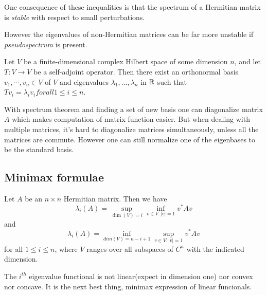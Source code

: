 One consequence of these inequalities is that the spectrum of a Hermitian matrix is \textit{stable} with respect to small perturbations.

However the eigenvalues of non-Hermitian matrices can be far more unstable if \textit{pseudospectrum} is present.

\begin{theorem}
    Let $V$ be a finite-dimensional complex Hilbert space of some dimension $n$, and let $T:V\to V$ be a self-adjoint operator. Then there exist an orthonormal basis $v_1,\cdots ,v_n \in V$ of $V$ and eigenvalues $\lambda_1,\dots,\lambda_n$ in $\mathbb{R}$ such that $Tv_i=\lambda_iv_i for all 1\leq i\leq n$.
\end{theorem}

With spectrum theorem and finding a set of new basis one can diagonalize matrix $A$ which makes computation of matrix function easier. 
But when dealing with multiple matrices, it's hard to diagonalize matrices simultaneously, unless all the matrices are commute. 
However one can still normalize one of the eigenbases to be the standard basis.

\subsection{Minimax formulae}

\begin{theorem}
    \label{Courant-Fisher minimax theorem}
    Let $A$ be an $n\times n$ Hermitian matrix. Then we have 
    \begin{equation}
        \lambda_i(A) = \sup_{\dim(V)=i} \inf_{v\in V:|v|=1} v^*Av
    \end{equation}
    and
    \begin{equation}
        \lambda_i(A) = \inf_{dim(V)=n-i+1} \sup_{v\in V:|v|=1} v^*Av
    \end{equation}
    for all $1\leq i\leq n$, where $V$ ranges over all subspaces of $C^n$ with the indicated dimension.
\end{theorem}

The $i^{th}$ eigenvalue functional is not linear(expect in dimension one) nor convex nor concave. It is the next best thing, minimax expression of linear funcionals.

